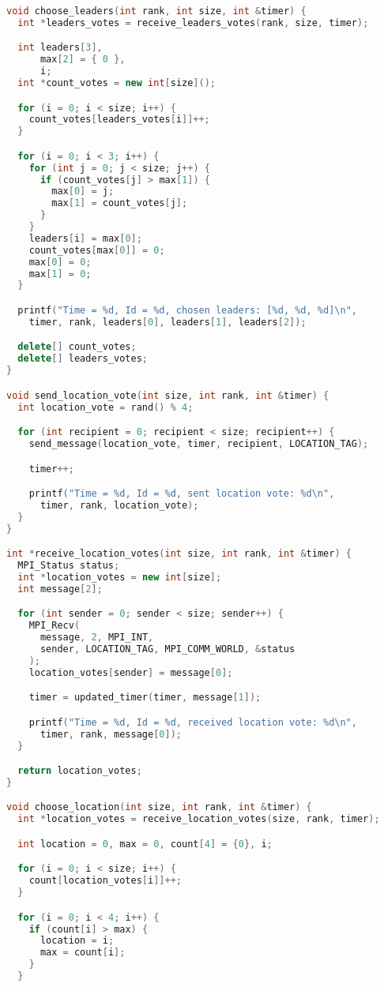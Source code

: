 \documentclass{article}
\begin{document}
\begin{lstlisting}[language=C++, caption=Message Passing Interface C++ Code, label=lst:code]
void choose_leaders(int rank, int size, int &timer) {
  int *leaders_votes = receive_leaders_votes(rank, size, timer);

  int leaders[3],
      max[2] = { 0 },
      i;
  int *count_votes = new int[size]();

  for (i = 0; i < size; i++) {
    count_votes[leaders_votes[i]]++;
  }

  for (i = 0; i < 3; i++) {
    for (int j = 0; j < size; j++) {
      if (count_votes[j] > max[1]) {
        max[0] = j;
        max[1] = count_votes[j];
      }
    }
    leaders[i] = max[0];
    count_votes[max[0]] = 0;
    max[0] = 0;
    max[1] = 0;
  }

  printf("Time = %d, Id = %d, chosen leaders: [%d, %d, %d]\n",
    timer, rank, leaders[0], leaders[1], leaders[2]);

  delete[] count_votes;
  delete[] leaders_votes;
}

void send_location_vote(int size, int rank, int &timer) {
  int location_vote = rand() % 4;

  for (int recipient = 0; recipient < size; recipient++) {
    send_message(location_vote, timer, recipient, LOCATION_TAG);

    timer++;

    printf("Time = %d, Id = %d, sent location vote: %d\n",
      timer, rank, location_vote);
  }
}

int *receive_location_votes(int size, int rank, int &timer) {
  MPI_Status status;
  int *location_votes = new int[size];
  int message[2];

  for (int sender = 0; sender < size; sender++) {
    MPI_Recv(
      message, 2, MPI_INT,
      sender, LOCATION_TAG, MPI_COMM_WORLD, &status
    );
    location_votes[sender] = message[0];

    timer = updated_timer(timer, message[1]);

    printf("Time = %d, Id = %d, received location vote: %d\n",
      timer, rank, message[0]);
  }

  return location_votes;
}

void choose_location(int size, int rank, int &timer) {
  int *location_votes = receive_location_votes(size, rank, timer);

  int location = 0, max = 0, count[4] = {0}, i;

  for (i = 0; i < size; i++) {
    count[location_votes[i]]++;
  }

  for (i = 0; i < 4; i++) {
    if (count[i] > max) {
      location = i;
      max = count[i];
    }
  }


\end{lstlisting}
\end{document}
